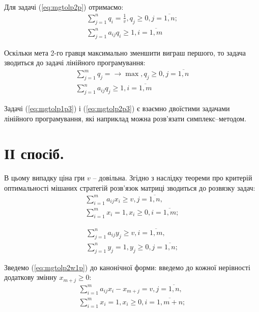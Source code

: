 \documentclass[12pt,a4paper]{report}
\begin{document}
Для задачі (\ref{eq:mgtolp2p}) отримаємо:
\begin{equation}
\begin{array}{l}
\displaystyle \sum_{j=1}^n q_i = \frac{1}{v}, q_j \geq 0, j=\overline{1,n};\\
\displaystyle \sum_{j=1}^n a_{ij} q_i \geq 1,  i=\overline{1,m}
\end{array}
\label{eq:mgtolp2p2}
\end{equation}

Оскільки мета 2-го гравця максимально зменшити виграш першого, то задача зводиться до задачі лінійного програмування:
\begin{equation}
\begin{array}{l}
\displaystyle \sum_{j=1}^m q_j = \to \max, q_j \geq 0, j=\overline{1,n}\\
\displaystyle \sum_{j=1}^n a_{ij} q_j \geq 1,  i=\overline{1,m}
\end{array}
\label{eq:mgtolp2p3}
\end{equation}

Задачі (\ref{eq:mgtolp1p3}) і (\ref{eq:mgtolp2p3}) є взаємно двоїстими задачами лінійного програмування, які наприклад можна розв’язати симплекс–методом.

\section{ІІ спосіб.}
В цьому випадку ціна гри $v$ – довільна. Згідно з наслідку теореми про критерій оптимальності мішаних стратегій розв’язок матриці зводиться до розвязку задач:
\begin{equation}
\begin{array}{l}
\displaystyle \sum_{i=1}^m a_{ij} x_i \geq v,  j=\overline{1,n},\\
\displaystyle \sum_{i=1}^m x_i = 1, x_i \geq 0, i=\overline{1,m};
\end{array}
\label{eq:mgtolp2w1p}
\end{equation}

\begin{equation}
\begin{array}{l}
\displaystyle \sum_{j=1}^n a_{ij} y_j \geq v,  i=\overline{1,m},\\
\displaystyle \sum_{j=1}^n y_j = 1, y_j \geq 0, j=\overline{1,n};
\end{array}
\label{eq:mgtolp2w2p}
\end{equation}

Зведемо (\ref{eq:mgtolp2w1p}) до канонічної форми: введемо до кожної нерівності додаткову змінну $x_{m+j} \geq 0$:
\[ \begin{array}{l}
\displaystyle \sum_{i=1}^m a_{ij} x_i  - x_{m+j} = v,  j=\overline{1,n},\\
\displaystyle \sum_{i=1}^m x_i = 1, x_i \geq 0, i=\overline{1,m+n};
\end{array} \]
\end{document}
